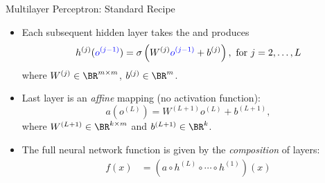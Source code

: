 \documentclass[usenames,dvipsnames,notes,11pt,aspectratio=169]{beamer}
\begin{document}
\begin{frame}{Multilayer Perceptron: Standard Recipe}
\begin{itemize}[<+->]
\item Each subsequent hidden layer takes the  and produces
\[
h^{(j)}({\color{blue}o^{(j-1)}})=\sigma\left(W^{(j)}{\color{blue}o^{(j-1)}}+b^{(j)}\right),\text{ for }j=2,\ldots,L
\]
where $W^{(j)}\in\BR^{m\times m}$, $b^{(j)}\in\BR^{m}$.

\item Last layer is an \emph{affine} mapping (no activation function): 
\[
a(o^{(L)})=W^{(L+1)}o^{(L)}+b^{(L+1)},
\]
where $W^{(L+1)}\in\BR^{k\times m}$ and $b^{(L+1)}\in\BR^{k}$.

\item The full neural network function is given by the \emph{composition} of
layers:
\begin{align}
f(x) &= \left(a\circ h^{(L)}\circ\cdots\circ h^{(1)}\right)(x)
\end{align}
\end{itemize}
\end{frame}
\end{document}
